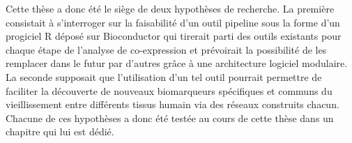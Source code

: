 Cette thèse a donc été le siège de deux hypothèses de recherche. La première consistait à s'interroger sur la faisabilité d'un outil pipeline sous la forme d'un progiciel R déposé sur Bioconductor qui tirerait parti des outils existants pour chaque étape de l'analyse de co-expression et prévoirait la possibilité de les remplacer dans le futur par d'autres grâce à une architecture logiciel modulaire. La seconde supposait que l'utilisation d'un tel outil pourrait permettre de faciliter la découverte de nouveaux biomarqueurs spécifiques et communs du vieillissement entre différents tissus humain via des réseaux construits chacun. Chacune de ces hypothèses a donc été testée au cours de cette thèse dans un chapitre qui lui est dédié.




% 
% 

